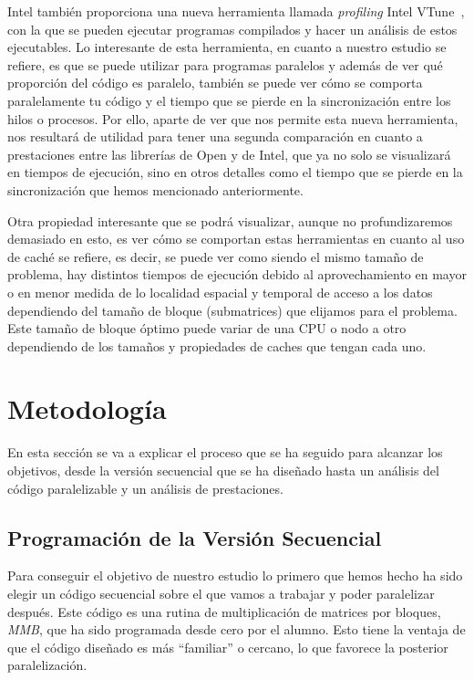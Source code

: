 \documentclass[a4paper,12pt]{article}
\begin{document}
Intel también proporciona una nueva herramienta llamada {\it profiling} Intel VTune~\cite{vtune}, con la que se pueden ejecutar programas compilados y hacer un análisis de estos ejecutables. Lo interesante de esta herramienta, en cuanto a nuestro estudio se refiere, es que se puede utilizar para programas paralelos y además de ver qué proporción del código es paralelo, también se puede ver cómo se comporta paralelamente tu código y el tiempo que se pierde en la sincronización entre los hilos o procesos. Por ello, aparte de ver que nos permite esta nueva herramienta, nos resultará de utilidad para tener una segunda comparación en cuanto a prestaciones entre las librerías de Open y de Intel, que ya no solo se visualizará en tiempos de ejecución, sino en otros detalles como el tiempo que se pierde en la sincronización que hemos mencionado anteriormente.

Otra propiedad interesante que se podrá visualizar, aunque no profundizaremos demasiado en esto, es  ver cómo se comportan estas herramientas en cuanto al uso de caché se refiere, es decir, se puede ver como siendo el mismo tamaño de problema, hay distintos tiempos de ejecución debido al aprovechamiento en mayor o en menor medida de lo localidad espacial y temporal de acceso a los datos dependiendo del tamaño de bloque (submatrices) que elijamos para el problema. Este tamaño de bloque óptimo puede variar de una CPU o nodo a otro dependiendo de los tamaños y propiedades de caches que tengan cada uno.





\newpage

\section{Metodología} \label{sec:metodologia}
En esta sección se va a explicar el proceso que se ha seguido para alcanzar los objetivos, desde la versión secuencial que se ha diseñado hasta un análisis del código paralelizable y un análisis de prestaciones.

\subsection{Programación de la Versión Secuencial}
\label{seccion:secu}

Para conseguir el objetivo de nuestro estudio lo primero que hemos hecho ha sido elegir un código secuencial sobre el que vamos a trabajar y poder paralelizar después. Este código es una rutina de multiplicación de matrices por bloques, {\it MMB}, que ha sido programada desde cero por el alumno. Esto tiene la ventaja de que el código diseñado es más ``familiar'' o cercano, lo que favorece la posterior paralelización.
\end{document}
